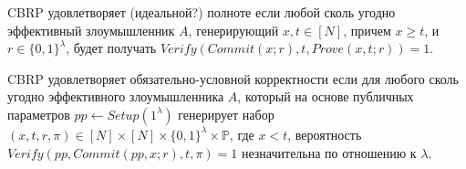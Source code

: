 \documentclass[a4paper]{report}
\renewcommand{\P}{\mathbb{P}}
\begin{document}
	CBRP удовлетворяет (идеальной?) полноте если любой сколь угодно эффективный злоумышленник $A$, генерирующий $x, t \in [N]$, причем  $x \geq t$, и $r \in \{0, 1\}^\lambda$, будет получать $Verify(Commit(x; r), t, Prove(x, t; r)) = 1$.

	CBRP удовлетворяет обязательно-условной корректности если для любого сколь угодно эффективного злоумышленника $A$, который на основе публичных параметров $pp \leftarrow Setup(1^\lambda)$ генерирует набор $(x, t, r, \pi) \in [N] \times [N] \times \{0, 1\}^\lambda \times \P$, где $x < t$, вероятность $Verify(pp, Commit(pp, x; r), t, \pi) = 1$ незначительна по отношению к $\lambda$.

	
	
\end{document}
